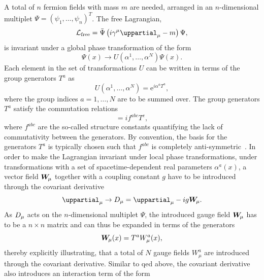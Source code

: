 A total of $n$ fermion fields with mass $m$ are needed, arranged in an $n$-dimensional multiplet $\Psi = (\psi_1,\dots,\psi_n)^T$. The free Lagrangian,
\begin{equation}
	\Lagr_\mathrm{free} = \bar{\Psi}\left(i\gamma^\mu\uppartial_\mu -m\right)\Psi,
	\label{eq:free_lagrangian}
\end{equation}
is invariant under a global phase transformation of the form
\begin{equation}
	\Psi(x) \rightarrow U(\alpha^1,\dots,\alpha^N)\Psi(x).
\end{equation}
Each element in the set of transformations $U$ can be written in terms of the group generators $T^a$ as
\begin{equation}
	U(\alpha^1,\dots,\alpha^N) = \mathrm{e}^{i\alpha^aT^a},
\end{equation}
where the group indices $a = 1,\dots,N$ are to be summed over. The group generators $T^a$ satisfy the commutation relations
\begin{equation}
	[T^a,T^b] = i f^{abc}T^c,
\end{equation}
where $f^{abc}$ are the so-called structure constants quantifying the lack of commutativity between the generators. By convention, the basis for the generators $T^a$ is typically chosen such that $f^{abc}$ is completely anti-symmetric~\cite{Brock:1354959}. In order to make the Lagrangian invariant under local phase transformations, \ie under transformations with a set of spacetime-dependent real parameters $\alpha^a(x)$, a vector field $\makemebold{W}_{\hspace{-0.25em}\mu}$ together with a coupling constant $g$ have to be introduced through the covariant derivative  
\begin{equation}
	\uppartial_\mu \rightarrow \codiff_\mu = \uppartial_\mu - ig\makemebold{W}_{\hspace{-0.25em}\mu}.
\end{equation}
As $\mathop{}\!D_\mu$ acts on the $n$-dimensional multiplet $\Psi$, the introduced gauge field $\makemebold{W}_{\hspace{-0.25em}\mu}$ has to be a $n\times n$ matrix and can thus be expanded in terms of the generators
\begin{equation}
	\makemebold{W}_{\hspace{-0.25em}\mu}(x) = T^a W_\mu^a(x),
\end{equation}
thereby explicitly illustrating, that a total of $N$ gauge fields $W^a_\mu$ are introduced through the covariant derivative. Similar to \gls{qed} above, the covariant derivative also introduces an interaction term of the form

